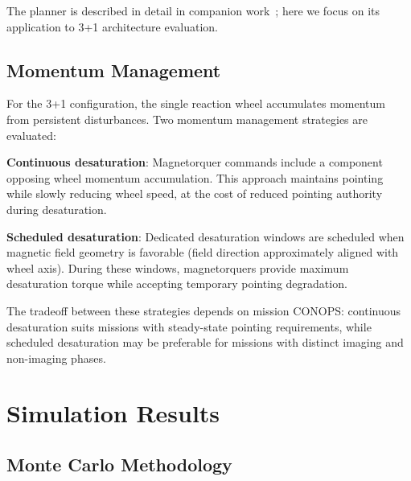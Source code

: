 \documentclass[9pt]{extarticle}
\begin{document}
The planner is described in detail in companion work~\cite{mckeen2024planner}; here we focus on its application to 3+1 architecture evaluation.

\subsection{Momentum Management}

For the 3+1 configuration, the single reaction wheel accumulates momentum from persistent disturbances. Two momentum management strategies are evaluated:

\textbf{Continuous desaturation}: Magnetorquer commands include a component opposing wheel momentum accumulation. This approach maintains pointing while slowly reducing wheel speed, at the cost of reduced pointing authority during desaturation.

\textbf{Scheduled desaturation}: Dedicated desaturation windows are scheduled when magnetic field geometry is favorable (field direction approximately aligned with wheel axis). During these windows, magnetorquers provide maximum desaturation torque while accepting temporary pointing degradation.

The tradeoff between these strategies depends on mission CONOPS: continuous desaturation suits missions with steady-state pointing requirements, while scheduled desaturation may be preferable for missions with distinct imaging and non-imaging phases.


%
\section{Simulation Results}\label{sec:results}

\subsection{Monte Carlo Methodology}
\end{document}
